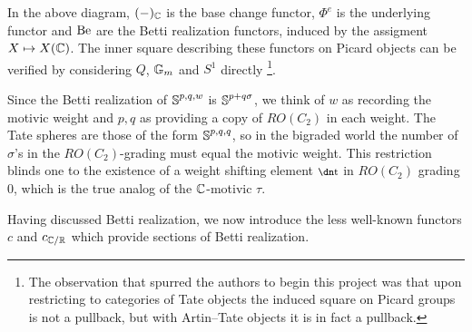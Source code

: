 \begin{rec}
  In the above diagram, $(-)_{\mathbb{C}}$ is the base change functor, $\Phi^e$ is the underlying functor and $\mathrm{Be}$ are the Betti realization functors, induced by the assigment $X \mapsto X(\mathbb{C})$.
  The inner square describing these functors on Picard objects can be verified by considering $Q$, $\mathbb{G}_m$ and $S^1$ directly \footnote{The observation that spurred the authors to begin this project was that upon restricting to categories of Tate objects the induced square on Picard groups is not a pullback, but with Artin--Tate objects it is in fact a pullback.}.
\end{rec}

\begin{rmk}
  Since the Betti realization of $\operatorname{\mathbb{S}}^{p,q,w}$ is $\operatorname{\mathbb{S}}^{p+q\sigma}$, we think of $w$ as recording the motivic weight and $p,q$ as providing a copy of $RO(C_2)$ in each weight.
  The Tate spheres are those of the form $\operatorname{\mathbb{S}}^{p,q,q}$, so in the bigraded world the number of $\sigma$'s in the $RO(C_2)$-grading must equal the motivic weight.
  This restriction blinds one to the existence of a weight shifting element $\ta$ in $RO(C_2)$ grading $0$, which is the true analog of the $\mathbb{C}$-motivic $\tau$.
\end{rmk}

Having discussed Betti realization, we now introduce the less well-known functors $c$ and $c_{\mathbb{C}/\mathbb{R}}$ which provide sections of Betti realization.


